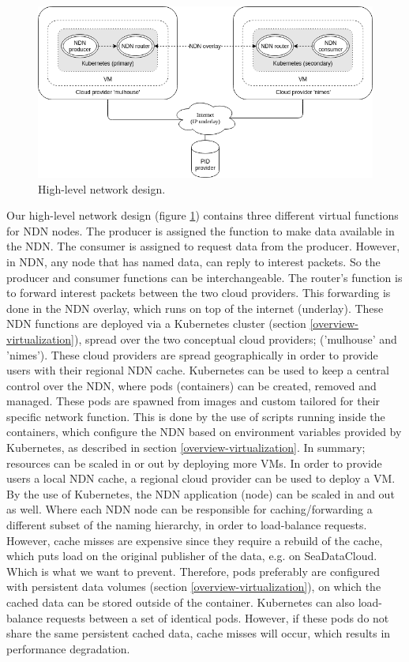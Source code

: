 \begin{figure}[H]
\centering
\includegraphics[width=\columnwidth]{Images/high-level-network-design.png}
\caption{High-level network design.}
\label{fig:high-level-network-design}
\end{figure}

Our high-level network design (figure \ref{fig:high-level-network-design}) contains three different virtual functions for NDN nodes. The producer is assigned the function to make data available in the NDN. The consumer is assigned to request data from the producer. However, in NDN, any node that has named data, can reply to interest packets. So the producer and consumer functions can be interchangeable. The router's function is to forward interest packets between the two cloud providers. This forwarding is done in the NDN overlay, which runs on top of the internet (underlay). These NDN functions are deployed via a Kubernetes cluster (section \ref{overview-virtualization}), spread over the two conceptual cloud providers; ('mulhouse' and 'nimes'). These cloud providers are spread geographically in order to provide users with their regional NDN cache. Kubernetes can be used to keep a central control over the NDN, where pods (containers) can be created, removed and managed. These pods are spawned from images and custom tailored for their specific network function. This is done by the use of scripts running inside the containers, which configure the NDN based on environment variables provided by Kubernetes, as described in section \ref{overview-virtualization}. In summary; resources can be scaled in or out by deploying more VMs. In order to provide users a local NDN cache, a regional cloud provider can be used to deploy a VM. By the use of Kubernetes, the NDN application (node) can be scaled in and out as well. Where each NDN node can be responsible for caching/forwarding a different subset of the naming hierarchy, in order to load-balance requests. However, cache misses are expensive since they require a rebuild of the cache, which puts load on the original publisher of the data, e.g. on SeaDataCloud. Which is what we want to prevent. Therefore, pods preferably are configured with persistent data volumes (section \ref{overview-virtualization}), on which the cached data can be stored outside of the container. Kubernetes can also load-balance requests between a set of identical pods. However, if these pods do not share the same persistent cached data, cache misses will occur, which results in performance degradation.


